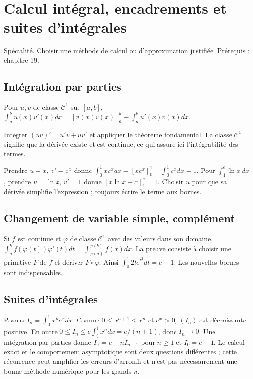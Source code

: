 \documentclass[../cours_tle.tex]{subfiles}
\begin{document}
\setcounter{chapter}{19}
\chapter{Calcul intégral, encadrements et suites d’intégrales}
\label{ch:20}
\begin{objectif}
Spécialité. Choisir une méthode de calcul ou d'approximation justifiée. Prérequis : chapitre 19.
\end{objectif}
\section{Intégration par parties}
\begin{theoreme}
Pour $u,v$ de classe $\mathcal C^1$ sur $[a,b]$,
$\displaystyle\int_a^b u(x)v'(x)dx=[u(x)v(x)]_a^b-\int_a^b u'(x)v(x)dx$.
\end{theoreme}
\begin{demonstration}
Intégrer $(uv)'=u'v+uv'$ et appliquer le théorème fondamental. La classe $\mathcal C^1$ signifie que la dérivée existe et est continue, ce qui assure ici l'intégrabilité des termes.
\end{demonstration}
Prendre $u=x$, $v'=e^x$ donne
$\int_0^1xe^x dx=[xe^x]_0^1-\int_0^1e^x dx=1$.
Pour $\int_1^e\ln x\,dx$, prendre $u=\ln x$, $v'=1$ donne $[x\ln x-x]_1^e=1$.
Choisir $u$ pour que sa dérivée simplifie l'expression ; toujours écrire le terme aux bornes.
\section{Changement de variable simple, complément}
Si $f$ est continue et $\varphi$ de classe $\mathcal C^1$ avec des valeurs dans son domaine,
$\int_a^b f(\varphi(t))\varphi'(t)dt=\int_{\varphi(a)}^{\varphi(b)}f(x)dx$.
La preuve consiste à choisir une primitive $F$ de $f$ et dériver $F\circ\varphi$.
Ainsi $\int_0^1 2t e^{t^2}dt=e-1$. Les nouvelles bornes sont indispensables.
\section{Suites d'intégrales}
Posons $I_n=\int_0^1x^ne^x dx$. Comme $0\le x^{n+1}\le x^n$ et $e^x>0$, $(I_n)$ est décroissante positive.
En outre $0\le I_n\le e\int_0^1x^n dx=e/(n+1)$, donc $I_n\to0$.
Une intégration par parties donne $I_n=e-nI_{n-1}$ pour $n\ge1$ et $I_0=e-1$.
Le calcul exact et le comportement asymptotique sont deux questions différentes ; cette récurrence peut amplifier les erreurs d'arrondi et n'est pas nécessairement une bonne méthode numérique pour les grands $n$.
\end{document}
